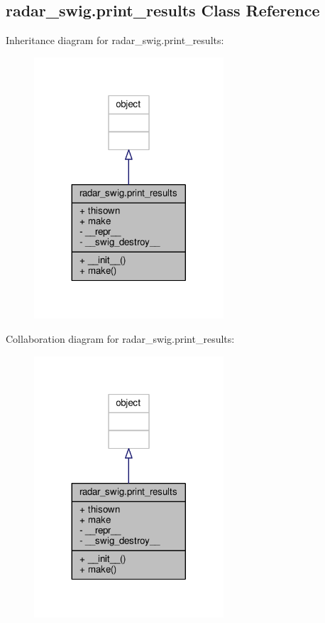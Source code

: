 \subsection{radar\+\_\+swig.\+print\+\_\+results Class Reference}
\label{classradar__swig_1_1print__results}


Inheritance diagram for radar\+\_\+swig.\+print\+\_\+results\+:
\nopagebreak
\begin{figure}[H]
\begin{center}
\leavevmode
\includegraphics[width=200pt]{db/d2f/classradar__swig_1_1print__results__inherit__graph}
\end{center}
\end{figure}


Collaboration diagram for radar\+\_\+swig.\+print\+\_\+results\+:
\nopagebreak
\begin{figure}[H]
\begin{center}
\leavevmode
\includegraphics[width=200pt]{df/d72/classradar__swig_1_1print__results__coll__graph}
\end{center}
\end{figure}
